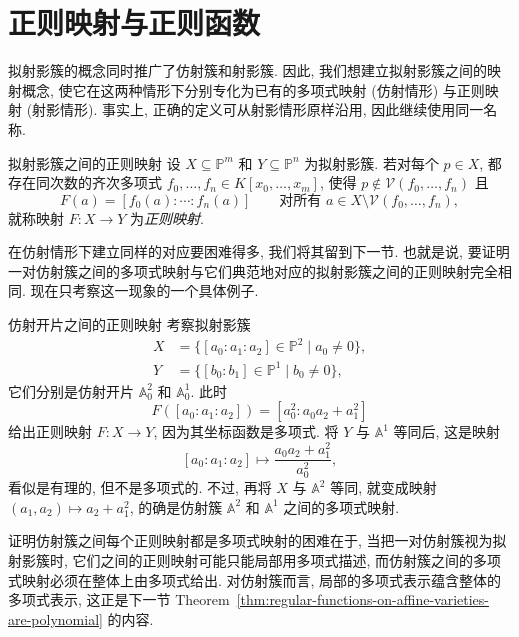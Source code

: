 \section{正则映射与正则函数}\label{sec:quasiprojective-regular-maps-and-functions}

拟射影簇的概念同时推广了仿射簇和射影簇. 因此, 我们想建立拟射影簇之间的映射概念, 使它在这两种情形下分别专化为已有的多项式映射 (仿射情形) 与正则映射 (射影情形). 事实上, 正确的定义可从射影情形原样沿用, 因此继续使用同一名称.

\begin{Definition}{拟射影簇之间的正则映射}\leavevmode\label{def:regular-map-of-quasiprojective-varieties}
设 $X\subseteq\mathbb{P}^{m}$ 和 $Y\subseteq\mathbb{P}^{n}$ 为拟射影簇. 若对每个 $p\in X$, 都存在同次数的齐次多项式 $f_{0},\ldots,f_{n}\in K[x_{0},\ldots,x_{m}]$, 使得 $p\notin\mathcal{V}(f_{0},\ldots,f_{n})$ 且
\[
  F(a)=[f_{0}(a):\cdots:f_{n}(a)]
  \qquad\text{对所有 }a\in X\setminus\mathcal{V}(f_{0},\ldots,f_{n}),
\]
就称映射 $F:X\to Y$ 为\emph{正则映射}.
\end{Definition}

在仿射情形下建立同样的对应要困难得多, 我们将其留到下一节. 也就是说, 要证明一对仿射簇之间的多项式映射与它们典范地对应的拟射影簇之间的正则映射完全相同. 现在只考察这一现象的一个具体例子.

\begin{Example}{仿射开片之间的正则映射}\leavevmode\label{ex:regular-map-of-affine-patches}
考察拟射影簇
\[
  \begin{aligned}
  X&=\{[a_{0}:a_{1}:a_{2}]\in\mathbb{P}^{2}\mid a_{0}\ne0\},\\
  Y&=\{[b_{0}:b_{1}]\in\mathbb{P}^{1}\mid b_{0}\ne0\},
  \end{aligned}
\]
它们分别是仿射开片 $\mathbb{A}^{2}_{0}$ 和 $\mathbb{A}^{1}_{0}$. 此时
\[
  F([a_{0}:a_{1}:a_{2}])=[a_{0}^{2}:a_{0}a_{2}+a_{1}^{2}]
\]
给出正则映射 $F:X\to Y$, 因为其坐标函数是多项式. 将 $Y$ 与 $\mathbb{A}^{1}$ 等同后, 这是映射
\[
  [a_{0}:a_{1}:a_{2}]\mapsto\frac{a_{0}a_{2}+a_{1}^{2}}{a_{0}^{2}},
\]
看似是有理的, 但不是多项式的. 不过, 再将 $X$ 与 $\mathbb{A}^{2}$ 等同, 就变成映射 $(a_{1},a_{2})\mapsto a_{2}+a_{1}^{2}$, 的确是仿射簇 $\mathbb{A}^{2}$ 和 $\mathbb{A}^{1}$ 之间的多项式映射.
\end{Example}

证明仿射簇之间每个正则映射都是多项式映射的困难在于, 当把一对仿射簇视为拟射影簇时, 它们之间的正则映射可能只能局部用多项式描述, 而仿射簇之间的多项式映射必须在整体上由多项式给出. 对仿射簇而言, 局部的多项式表示蕴含整体的多项式表示, 这正是下一节 Theorem~\ref{thm:regular-functions-on-affine-varieties-are-polynomial} 的内容.

